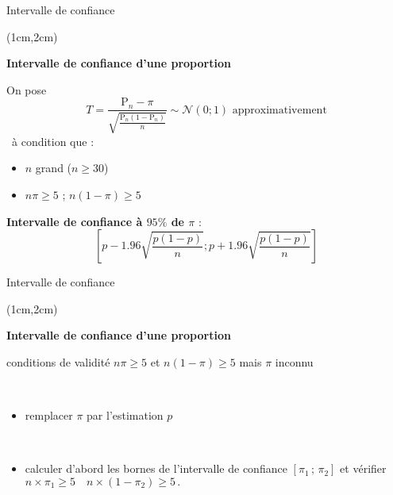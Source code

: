 \documentclass{beamer}
\begin{document}

\begin{frame}{Intervalle de confiance}
\begin{textblock*}{\textwidth}(1cm,2cm)

\begin{center}{\bf \Large Intervalle de confiance d'une proportion} \end{center}


On pose 
$$
T=\frac{\mathrm{P}_n - \pi}{\sqrt{\frac{\mathrm{P}_n (1-\mathrm{P}_n)}{n}}} \sim \mathcal{N}(0 ; 1) \text{ approximativement}
$$ 
\
à condition que :
\begin{itemize}
\item $n$ grand ($n\geq 30$)
\item $n\pi\geq 5$ ; $n(1-\pi)\geq 5$
\end{itemize}
\vspace{0.3cm}
{\bf Intervalle de confiance à $95 \%$ de $\pi$} :
$$
\left[ p -1.96 \sqrt{\frac{p(1-p)}{n}} ; p +1.96 \sqrt{\frac{p(1-p)}{n}} \right]
$$



 \end{textblock*}

\end{frame}



\begin{frame}{Intervalle de confiance}
\begin{textblock*}{\textwidth}(1cm,2cm)

\begin{center}{\bf \Large Intervalle de confiance d'une proportion} \end{center}

\vspace{0.5cm}


conditions de validité $n\pi\geq 5$
et $n(1-\pi)\geq 5$ mais $\pi$  inconnu

\
\begin{itemize}
\item remplacer $\pi$ par l'estimation $p$

\

\item calculer d'abord les bornes de l'intervalle de confiance $[\pi_1\,;\,\pi_2]$ et vérifier $n\times\pi_1 \geq  5 \quad n\times (1-\pi_2) \geq  5\,.
$
\end{itemize}

 \end{textblock*}

\end{frame}
\end{document}
